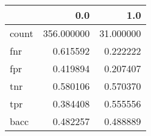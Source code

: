 \begin{tabular}{lrr}
\toprule
{} &         0.0 &        1.0 \\
\midrule
count &  356.000000 &  31.000000 \\
fnr   &    0.615592 &   0.222222 \\
fpr   &    0.419894 &   0.207407 \\
tnr   &    0.580106 &   0.570370 \\
tpr   &    0.384408 &   0.555556 \\
bacc  &    0.482257 &   0.488889 \\
\bottomrule
\end{tabular}
